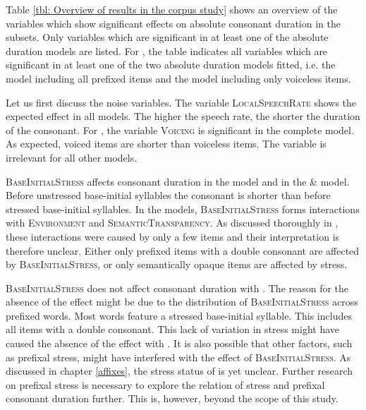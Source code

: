 Table \ref{tbl: Overview of results in the corpus study} shows an overview of the variables which show significant effects on absolute consonant duration in the subsets. Only variables which are significant in at least one of the absolute duration models are listed. For , the table indicates all variables which are significant in at least one of the two absolute duration models fitted, i.e. the model including all prefixed items and the model including only voiceless items.







Let us first discuss the noise variables. The variable \textsc{LocalSpeechRate} shows the expected effect in all models.  The higher the speech rate, the shorter the duration of the consonant. 
For , the variable \textsc{Voicing} is significant in the complete model. As expected, voiced items are shorter than voiceless items. The variable is irrelevant for all other models.

\textsc{BaseInitialStress} affects consonant duration in the model and in the  \&  model. Before unstressed base-initial syllables the consonant is shorter than before stressed base-initial syllables. 
In the models, \textsc{BaseInitialStress} forms interactions with \textsc{Environment} and \textsc{SemanticTransparency}. As discussed thoroughly in , these interactions were caused by only a few items and their interpretation is therefore unclear. Either only prefixed items with a double consonant are affected by \textsc{BaseInitialStress}, or only semantically opaque items are affected by stress.

 \textsc{BaseInitialStress} does not affect consonant duration with . The reason for the absence of the effect might be due to the distribution of \textsc{BaseInitialStress} across prefixed words. Most words feature a stressed base-initial syllable. This includes all items with a double consonant. This lack of variation in stress might have caused the absence of the effect with . It is also possible that other factors, such as prefixal stress, might have interfered with the effect of \textsc{BaseInitialStress}. As discussed in chapter \ref{affixes}, the stress status of  is yet unclear. Further research on prefixal stress is necessary to explore the relation of stress and prefixal consonant duration further. This is, however, beyond the scope of this study.

